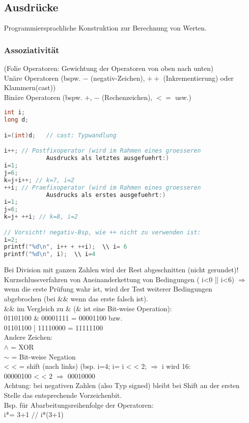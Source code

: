 \subsection{Ausdrücke}
Programmiersprachliche Konstruktion zur Berechnung von Werten.
\subsubsection{Assoziativität}
(Folie Operatoren: Gewichtung der Operatoren von oben nach unten)\medskip\\
Unäre Operatoren (bspw. $-$ (negativ-Zeichen), $++$ (Inkrementierung) oder Klammern(cast))\\
Binäre Operatoren (bspw. $+$, $-$ (Rechenzeichen), $<=$ usw.)
\begin{lstlisting}[language=C]
int i;
long d;

i=(int)d;	// cast: Typwandlung

i++; // Postfixoperator (wird im Rahmen eines groesseren 
			Ausdrucks als letztes ausgefuehrt:)
i=1;
j=6;
k=j+i++; // k=7, i=2
++i; // Praefixoperator (wird im Rahmen eines groesseren 
			Ausdrucks als erstes ausgefuehrt:)
i=1;
j=6;
k=j+ ++i; // k=8, i=2

// Vorsicht! negativ-Bsp, wie ++ nicht zu verwenden ist:
i=2;
printf("%d\n", i++ + ++i);	\\ i= 6
printf("%d\n", i);	\\ i=4
\end{lstlisting}
Bei Division mit ganzen Zahlen wird der Rest abgeschnitten (nicht gerundet)!\medskip\\
Kurzschlussverfahren von Aneinanderkettung von Bedingungen ( i<0 || i<6) $\Rightarrow$ wenn die erste Prüfung wahr ist, wird der Test weiterer Bedingungen abgebrochen (bei \&\& wenn das erste falsch ist).\bigskip\\
\&\& im Vergleich zu \& (\& ist eine Bit-weise Operation): \\
01101100 \& 00001111 = 00001100 bzw. \\
01101100 | 11110000 = 11111100 \smallskip\\
Andere Zeichen: \\
$\wedge$ = XOR\\
$\sim$ = Bit-weise Negation\\
<\! < = shift (nach links) (bsp. i=4; i= i <\! < 2; $\Rightarrow$ i wird 16:\\
00000100 <\! < 2 $\Rightarrow$ 00010000\\
Achtung: bei negativen Zahlen (also Typ signed) bleibt bei Shift an der ersten Stelle das entsprechende Vorzeichenbit.\\
Bsp. für Abarbeitungsreihenfolge der Operatoren:\\
i*= 3+1		// i*(3+1)

